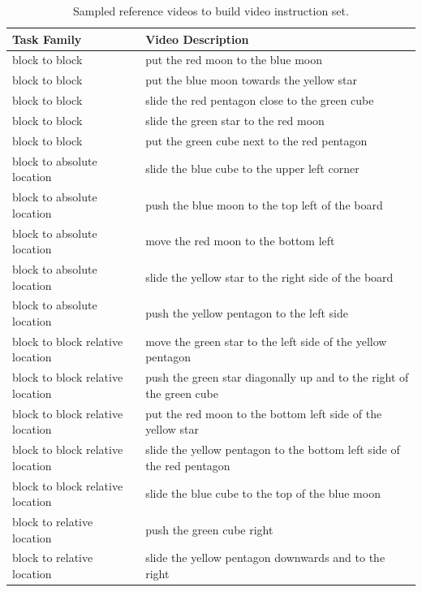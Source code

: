 \begin{table}[t]
\footnotesize
\setlength{\tabcolsep}{6 mm}
\caption{Sampled reference videos to build video instruction set. } \label{tab:table_ref_videos}
\centering
\begin{tabular}{@{}ll@{}}
\toprule
\textbf{Task Family} & \textbf{Video Description}                      \\ \midrule
block to block          & put the red moon to the blue moon               \\
block to block          & put the blue moon towards the yellow star       \\ 
block to block          & slide the red pentagon close to the green cube  \\
block to block          & slide the green star to the red moon            \\
block to block          & put the green cube next to the red pentagon     \\ \midrule
block to absolute location   & slide the blue cube to the upper left corner           \\
block to absolute location   & push the blue moon to the top left of the board        \\
block to absolute location   & move the red moon to the bottom left                   \\ 
block to absolute location   & slide the yellow star to the right side of the board   \\
block to absolute location   & push the yellow pentagon to the left side              \\ \midrule
block to block relative location & move the green star to the left side of the yellow pentagon           \\
block to block relative location & push the green star diagonally up and to the right of the green cube  \\
block to block relative location & put the red moon to the bottom left side of the yellow star           \\
block to block relative location & slide the yellow pentagon to the bottom left side of the red pentagon \\
block to block relative location & slide the blue cube to the top of the blue moon                       \\ \midrule
block to relative location & push the green cube right   \\
block to relative location & slide the yellow pentagon downwards and to the right   \\

\end{tabular}
\end{table}

